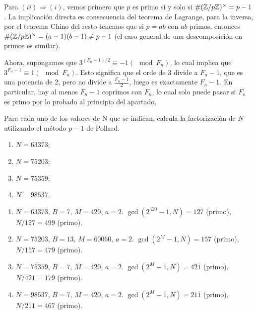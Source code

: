 \documentclass[twoside]{article}
\begin{document}
\begin{solucion}
\begin{enumerate}
Para $(ii)\Rightarrow (i)$, vemos primero que $p$ es primo si y solo si $\#(\mathbb{Z}/p\mathbb{Z})^\times=p-1$. La implicación directa es consecuencia del teorema de Lagrange, para la inversa, por el teorema Chino del resto tenemos que si $p=ab$ con $ab$ primos, entonces $\#(\mathbb{Z}/p\mathbb{Z})^\times=(a-1)(b-1)\neq p-1$ (el caso general de una descomposición en primos es similar). 

Ahora, supongamos que $3^{(F_n−1)/2} ≡ −1 (\mod F_n)$, lo cual implica que $3^{F_n−1} ≡ 1 (\mod F_n)$. Esto significa que el orde de 3 divide a $F_n-1$, que es una potencia de 2, pero no divide a $\frac{F_n-1}{2}$, luego es exactamente $F_n-1$. En particular, hay al menos $F_n-1$ coprimos con $F_n$, lo cual solo puede pasar si $F_n$ es primo por lo probado al principio del apartado. 




 
\end{enumerate}
\end{solucion}

\newpage

\begin{ejercicio}{2}
Para cada uno de los valores de N que se indican, calcula la factorización de $N$
utilizando el método $p − 1$ de Pollard. 
\begin{enumerate}[1)]
\item $N = 63373$;
\item $N = 75203$;
\item $N = 75359$;
\item $N = 98537$.
\end{enumerate}
\end{ejercicio}
\begin{solucion}
\begin{enumerate}
\item  $N = 63373$, $B=7$, $M=420$, $a=2$. $\gcd(2^{420}-1, N)=127$ (primo), $N/127=499$ (primo). 
\item  $N = 75203$, $B=13$, $M=60060$, $a=2$. $\gcd(2^M-1,N)=157$ (primo), $N/157=479$ (primo). 
\item  $N = 75359$, $B=7$, $M=420$, $a=2$. $\gcd(2^M-1,N)=421$ (primo), $N/421=179$ (primo).
\item  $N = 98537$, $B=7$, $M=420$, $a=2$. $\gcd(2^M-1,N)=211$ (primo), $N/211=467$ (primo). 
\end{enumerate}
\end{solucion}

\newpage
\end{document}
